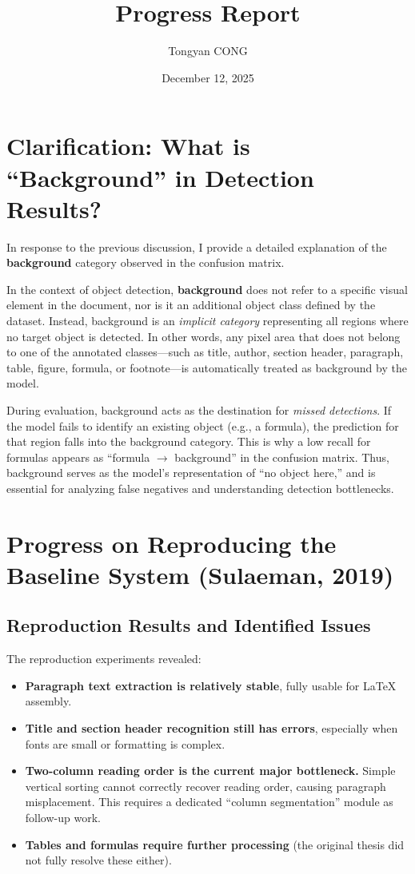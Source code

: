 \documentclass{article}
\title{\textbf{Progress Report}}
\author{Tongyan CONG}
\date{December 12, 2025}
\begin{document}
\maketitle

\section{Clarification: What is ``Background'' in Detection Results?}
In response to the previous discussion, I provide a detailed explanation of the \textbf{background} category observed in the confusion matrix.

\noindent In the context of object detection, \textbf{background} does not refer to a specific visual element in the document, nor is it an additional object class defined by the dataset. Instead, background is an \textit{implicit category} representing all regions where no target object is detected. In other words, any pixel area that does not belong to one of the annotated classes—such as title, author, section header, paragraph, table, figure, formula, or footnote—is automatically treated as background by the model.

\noindent During evaluation, background acts as the destination for \textit{missed detections}. If the model fails to identify an existing object (e.g., a formula), the prediction for that region falls into the background category. This is why a low recall for formulas appears as ``formula $\rightarrow$ background'' in the confusion matrix. Thus, background serves as the model's representation of ``no object here,'' and is essential for analyzing false negatives and understanding detection bottlenecks.




\section{Progress on Reproducing the Baseline System (Sulaeman, 2019)}

\subsection{Reproduction Results and Identified Issues}
The reproduction experiments revealed:
\begin{itemize}
    \item \textbf{Paragraph text extraction is relatively stable}, fully usable for LaTeX assembly.
    \item \textbf{Title and section header recognition still has errors}, especially when fonts are small or formatting is complex.
    \item \textbf{Two-column reading order is the current major bottleneck.} Simple vertical sorting cannot correctly recover reading order, causing paragraph misplacement. This requires a dedicated ``column segmentation'' module as follow-up work.
    \item \textbf{Tables and formulas require further processing} (the original thesis did not fully resolve these either).
\end{itemize}
\end{document}
